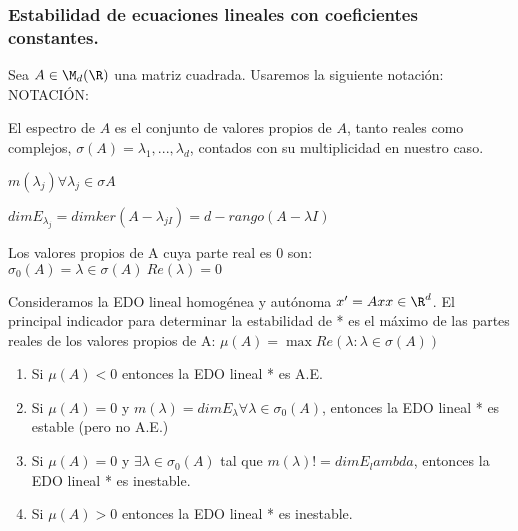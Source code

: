 \subsubsection{Estabilidad de ecuaciones lineales con coeficientes constantes.}
Sea $A \in \M_d(\R)$ una matriz cuadrada.  Usaremos la siguiente notación:
NOTACIÓN:
\begin{ndef}[Espectro de $A$]
El espectro de $A$ es el conjunto de valores propios de $A$, tanto reales como complejos, $\sigma(A)={\lambda_1,...,\lambda_d}$, contados con su multiplicidad en nuestro caso.
\end{ndef}
\begin{ndef}
$m(\lambda_j) \forall \lambda_j \in \sigma{A}$
\end{ndef}
\begin{ndef}
$dim E_{\lambda_j} = dim ker(A-\lambda_{jI})= d-rango(A-\lambda I)$
\end{ndef}
\begin{ndef}
Los valores propios de A cuya parte real es 0 son:
$\sigma_0(A)={\lambda \in \sigma(A) \ Re(\lambda)=0}$
\end{ndef}

Consideramos la EDO lineal homogénea y autónoma $x'=Ax x\in\R^d$. El principal indicador para determinar la estabilidad de * es el máximo de las partes reales de los valores propios de A:
$\mu(A)=\max{Re(\lambda : \lambda\in\sigma(A))}$

\begin{nth}
\begin{enumerate}
\item Si $\mu(A)<0$ entonces la EDO lineal * es A.E.
\item Si $\mu(A)=0$ y $m(\lambda)=dimE_\lambda \forall \lambda \in \sigma_0(A)$, entonces la EDO lineal * es estable (pero no A.E.)
\item Si $\mu(A)=0$ y $\exists \lambda \in \sigma_0(A)$ tal que $m(\lambda) != dim E_lambda$, entonces la EDO lineal * es inestable.
\item Si $\mu(A)>0$ entonces la EDO lineal * es inestable.
\end{enumerate}
\end{nth}

